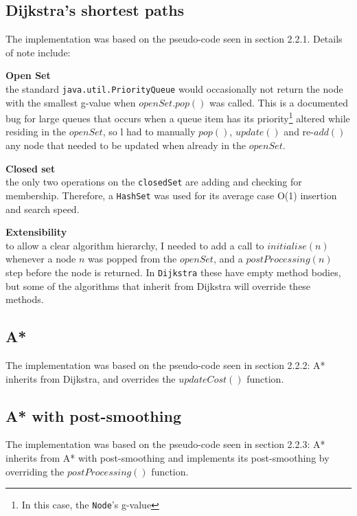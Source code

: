 \documentclass[12pt,twoside,notitlepage]{report}
\begin{document}
\subsection{Dijkstra's shortest paths}

The implementation was based on the pseudo-code seen in section 2.2.1. Details of note include:
\begin{description}
  \item {\bf Open Set}\\ \hfill
  the standard {\tt java.util.PriorityQueue} would occasionally not return the node with the smallest g-value when $openSet.pop()$ was called. This is a documented bug for large queues that occurs when a queue item has its priority\footnote{In this case, the {\tt Node}'s g-value} altered while residing in the $openSet$, so l had to manually $pop()$, $update()$ and re-$add()$ any node that needed to be updated when already in the $openSet$.
  \item {\bf Closed set}\\ \hfill
  the only two operations on the {\tt closedSet} are adding and checking for membership. Therefore, a {\tt HashSet} was used for its average case O(1) insertion and search speed.
  \item {\bf Extensibility} \\ \hfill
  to allow a clear algorithm hierarchy, I needed to add a call to $initialise(n)$ whenever a node $n$ was popped from the $openSet$, and a $postProcessing(n)$ step before the node is returned. In {\tt Dijkstra} these have empty method bodies, but some of the algorithms that inherit from Dijkstra will override these methods.
  \end{description}


\subsection{A*}

The implementation was based on the pseudo-code seen in section 2.2.2: A* inherits from Dijkstra, and overrides the $updateCost()$ function.

\subsection{A* with post-smoothing}

The implementation was based on the pseudo-code seen in section 2.2.3: A* inherits from A* with post-smoothing and implements its post-smoothing by overriding the $postProcessing()$ function.\\
\end{document}
